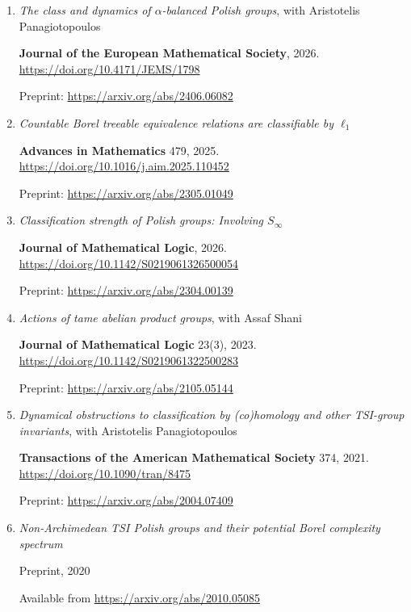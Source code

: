 \documentclass[letterpaper]{article}
\begin{document}
\begin{enumerate}

    \item \emph{The class and dynamics of $\alpha$-balanced Polish groups}, with Aristotelis Panagiotopoulos

    \textbf{Journal of the European Mathematical Society}, 2026. \url{https://doi.org/10.4171/JEMS/1798}

    Preprint: \url{https://arxiv.org/abs/2406.06082}
    
    \item \emph{Countable Borel treeable equivalence relations are classifiable by $\ell_1$}
    
    \textbf{Advances in Mathematics} 479, 2025. \url{https://doi.org/10.1016/j.aim.2025.110452}
    
    Preprint: \url{https://arxiv.org/abs/2305.01049}
    
    \item \emph{Classification strength of Polish groups: Involving $S_\infty$}
    
    \textbf{Journal of Mathematical Logic}, 2026. \url{https://doi.org/10.1142/S0219061326500054}
    
    Preprint: \url{https://arxiv.org/abs/2304.00139}
    
    \item \emph{Actions of tame abelian product groups}, with Assaf Shani
    
    \textbf{Journal of Mathematical Logic} 23(3), 2023. \url{https://doi.org/10.1142/S0219061322500283}

    Preprint: \url{https://arxiv.org/abs/2105.05144}

    \item \emph{Dynamical obstructions to classification by (co)homology and other TSI-group invariants}, with Aristotelis Panagiotopoulos
    
    \textbf{Transactions of the American Mathematical Society} 374, 2021. \url{https://doi.org/10.1090/tran/8475}
    
    Preprint: \url{https://arxiv.org/abs/2004.07409}

    \item \emph{Non-Archimedean TSI Polish groups and their potential Borel complexity spectrum}
    
    Preprint, 2020
    
    Available from \url{https://arxiv.org/abs/2010.05085}

    
\end{enumerate}
\end{document}

